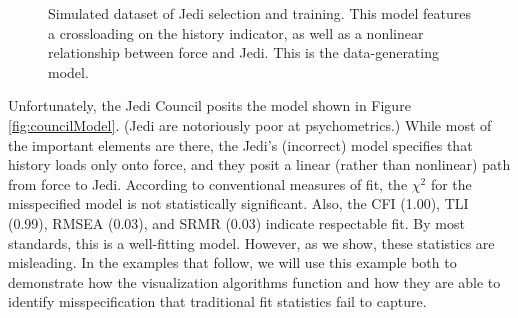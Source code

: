 \documentclass[
  english,
  man]{apa6}
\begin{document}
\begin{figure}
\begin{center}
\caption{Simulated dataset of Jedi selection and training. This model features a crossloading on the history indicator, as well as a nonlinear relationship between force and Jedi. This is the data-generating model.}
\label{fig:force}
\end{center}
\end{figure}

Unfortunately, the Jedi Council posits the model shown in Figure \ref{fig:councilModel}. (Jedi are notoriously poor at psychometrics.) While most of the important elements are there, the Jedi's (incorrect) model specifies that history loads only onto force, and they posit a linear (rather than nonlinear) path from force to Jedi. According to conventional measures of fit, the \(\chi^2\) for the misspecified model is not statistically significant. Also, the CFI (1.00), TLI (0.99), RMSEA (0.03), and SRMR (0.03) indicate respectable fit. By most standards, this is a well-fitting model. However, as we show, these statistics are misleading. In the examples that follow, we will use this example both to demonstrate how the visualization algorithms function and how they are able to identify misspecification that traditional fit statistics fail to capture.
\end{document}
